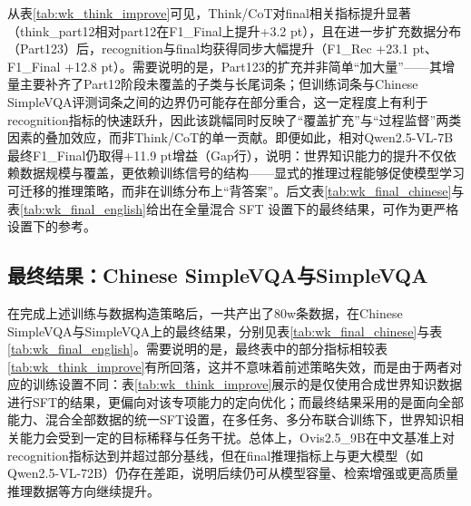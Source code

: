 \begin{table}[htbp]
\centering
\caption{实验二：引入Think/CoT与数据扩充后的改进结果（Chinese SimpleVQA）。Part12/Part123表示逐步扩充的数据批次；think表示FinalQA带推理过程的训练设置；Gap为最优模型相对Qwen2.5-VL-7B的提升。}
\label{tab:wk_think_improve}
\small
\renewcommand{\arraystretch}{1.3}

\end{table}

从表\ref{tab:wk_think_improve}可见，Think/CoT对final相关指标提升显著（think\_part12相对part12在F1\_Final上提升+3.2 pt），且在进一步扩充数据分布（Part123）后，recognition与final均获得同步大幅提升（F1\_Rec +23.1 pt、F1\_Final +12.8 pt）。需要说明的是，Part123的扩充并非简单“加大量”——其增量主要补齐了Part12阶段未覆盖的子类与长尾词条；但训练词条与Chinese SimpleVQA评测词条之间的边界仍可能存在部分重合，这一定程度上有利于recognition指标的快速跃升，因此该跳幅同时反映了“覆盖扩充”与“过程监督”两类因素的叠加效应，而非Think/CoT的单一贡献。即便如此，相对Qwen2.5-VL-7B最终F1\_Final仍取得+11.9 pt增益（Gap行），说明：世界知识能力的提升不仅依赖数据规模与覆盖，更依赖训练信号的结构——显式的推理过程能够促使模型学习可迁移的推理策略，而非在训练分布上“背答案”。后文表\ref{tab:wk_final_chinese}与表\ref{tab:wk_final_english}给出在全量混合 SFT 设置下的最终结果，可作为更严格设置下的参考。

\subsection{最终结果：Chinese SimpleVQA与SimpleVQA}
在完成上述训练与数据构造策略后，一共产出了80w条数据，在Chinese SimpleVQA与SimpleVQA上的最终结果，分别见表\ref{tab:wk_final_chinese}与表\ref{tab:wk_final_english}。需要说明的是，最终表中的部分指标相较表\ref{tab:wk_think_improve}有所回落，这并不意味着前述策略失效，而是由于两者对应的训练设置不同：表\ref{tab:wk_think_improve}展示的是仅使用合成世界知识数据进行SFT的结果，更偏向对该专项能力的定向优化；而最终结果采用的是面向全部能力、混合全部数据的统一SFT设置，在多任务、多分布联合训练下，世界知识相关能力会受到一定的目标稀释与任务干扰。总体上，Ovis2.5\_9B在中文基准上对recognition指标达到并超过部分基线，但在final推理指标上与更大模型（如Qwen2.5-VL-72B）仍存在差距，说明后续仍可从模型容量、检索增强或更高质量推理数据等方向继续提升。

